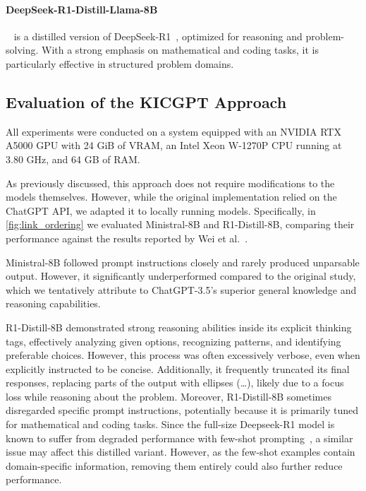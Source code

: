 \documentclass[12pt,a4paper]{article}
\newcommand{\modelministral}{Ministral-8B\xspace}
\newcommand{\modeldeepseek}{R1-Distill-8B\xspace}
\begin{document}
\paragraph{DeepSeek-R1-Distill-Llama-8B}~\cite{deepseekai2025deepseekr1distillllama8b} is a distilled version of DeepSeek-R1~\cite{guo2025deepseek}, optimized for reasoning and problem-solving.
With a strong emphasis on mathematical and coding tasks, it is particularly effective in structured problem domains.


\subsection{Evaluation of the KICGPT Approach}

All experiments were conducted on a system equipped with an NVIDIA RTX A5000 GPU with 24 GiB of VRAM, an Intel Xeon W-1270P CPU running at 3.80 GHz, and 64 GB of RAM.

As previously discussed, this approach does not require modifications to the models themselves.
However, while the original implementation relied on the ChatGPT API, we adapted it to locally running models.
Specifically, in \cref{fig:link_ordering} we evaluated \modelministral and \modeldeepseek, comparing their performance against the results reported by Wei et al.~\cite{wei2023kicgpt}.

\modelministral followed prompt instructions closely and rarely produced unparsable output.
However, it significantly underperformed compared to the original study,
which we tentatively attribute to ChatGPT-3.5’s superior general knowledge and reasoning capabilities.

\modeldeepseek demonstrated strong reasoning abilities inside its explicit thinking tags, effectively analyzing given options, recognizing patterns, and identifying preferable choices.
However, this process was often excessively verbose, even when explicitly instructed to be concise.
Additionally, it frequently truncated its final responses, replacing parts of the output with ellipses (\dots), likely due to a focus loss while reasoning about the problem.
Moreover, \modeldeepseek sometimes disregarded specific prompt instructions, potentially because it is primarily tuned for mathematical and coding tasks.
Since the full-size Deepseek-R1 model is known to suffer from degraded performance with few-shot prompting~\cite{guo2025deepseek}, a similar issue may affect this distilled variant.
However, as the few-shot examples contain domain-specific information, removing them entirely could  also further reduce performance.
\end{document}

